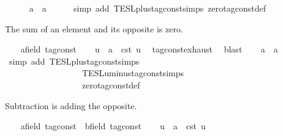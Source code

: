 \begin{isabellebody}
\ \ \isamarkupfalse%
\ {\isacartoucheopen}{}\ {\isacharplus}\ a\ {\isacharequal}\ a{\isacartoucheclose}\isanewline
\ \ \ \ \isamarkupfalse%
\ {\isacharparenleft}simp\ add{\isacharcolon}\ TESL{\isachardot}plus{\isacharunderscore}tag{\isacharunderscore}const{\isachardot}simps\ zero{\isacharunderscore}tag{\isacharunderscore}const{\isacharunderscore}def{\isacharparenright}\isanewline
{}\isamarkupfalse%
%
\begin{isamarkuptext}%
The sum of an element and its opposite is zero.%
\end{isamarkuptext}\isamarkuptrue%
\ \ \isamarkupfalse%
\ a{\isacharcolon}{\isacharcolon}{\isacartoucheopen}{\isacharprime}{\isasymtau}{\isacharcolon}{\isacharcolon}field\ tag{\isacharunderscore}const{\isacartoucheclose}\isanewline
\ \ \isamarkupfalse%
\ u\ \ {\isacartoucheopen}a\ {\isacharequal}\ {\isasymtau}\isactrlsub c\isactrlsub s\isactrlsub t\ u{\isacartoucheclose}\ \isamarkupfalse%
\ tag{\isacharunderscore}const{\isachardot}exhaust\ \isamarkupfalse%
\ blast\isanewline
\ \ \isamarkupfalse%
\ {\isacartoucheopen}{\isacharminus}a\ {\isacharplus}\ a\ {\isacharequal}\ {}{\isacartoucheclose}\isanewline
\ \ \ \ \isamarkupfalse%
\ {\isacharparenleft}simp\ add{\isacharcolon}\ TESL{\isachardot}plus{\isacharunderscore}tag{\isacharunderscore}const{\isachardot}simps\isanewline
\ \ \ \ \ \ \ \ \ \ \ \ \ \ \ \ \ \ TESL{\isachardot}uminus{\isacharunderscore}tag{\isacharunderscore}const{\isachardot}simps\isanewline
\ \ \ \ \ \ \ \ \ \ \ \ \ \ \ \ \ \ zero{\isacharunderscore}tag{\isacharunderscore}const{\isacharunderscore}def{\isacharparenright}\isanewline
{}\isamarkupfalse%
%
\begin{isamarkuptext}%
Subtraction is adding the opposite.%
\end{isamarkuptext}\isamarkuptrue%
\ \ \isamarkupfalse%
\ a{\isacharcolon}{\isacharcolon}{\isacartoucheopen}{\isacharprime}{\isasymtau}{\isacharcolon}{\isacharcolon}field\ tag{\isacharunderscore}const{\isacartoucheclose}\ \ b{\isacharcolon}{\isacharcolon}{\isacartoucheopen}{\isacharprime}{\isasymtau}{\isacharcolon}{\isacharcolon}field\ tag{\isacharunderscore}const{\isacartoucheclose}\isanewline
\ \ \isamarkupfalse%
\ u\ \ {\isacartoucheopen}a\ {\isacharequal}\ {\isasymtau}\isactrlsub c\isactrlsub s\isactrlsub t\ u{\isacartoucheclose}\ \isamarkupfalse%

\end{isabellebody}
